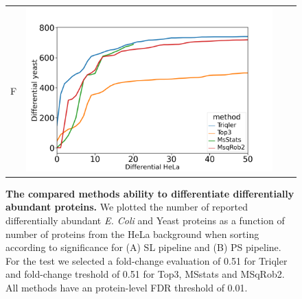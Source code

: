 \documentclass[11pt]{article}
\begin{document}
\begin{figure}[hbt]
\begin{tabular}{lclc}
        F & \includegraphics[width=0.45\linewidth]{../../result/report_plots_pipeline/diff_HeLa_vs_nonHeLa_PS_yeast_0.51.png} \\ 

    \end{tabular}
    \caption{{\bf The compared methods ability to differentiate differentially abundant proteins.} We plotted the number of reported differentially abundant  {\em E. Coli} and Yeast proteins as a function of number of proteins from the HeLa background when sorting according to significance for (A) SL pipeline and (B) PS pipeline. For the test we selected a fold-change evaluation of 0.51 for Triqler and fold-change treshold of 0.51 for Top3, MSstats and MSqRob2. All methods have an protein-level FDR threshold of 0.01. \label{fig:ability_to_differentiate_differentially_abundant_specie_vs_hela}}
\end{figure}
\end{document}
